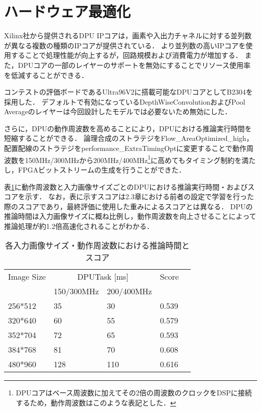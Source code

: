 \section{ハードウェア最適化}
Xilinx社から提供されるDPU IPコアは，画素や入出力チャネルに対する並列数が異なる複数の種類のIPコアが提供されている．
より並列数の高いIPコアを使用することで処理性能が向上するが，回路規模および消費電力が増加する．
また，DPUコアの一部のレイヤーのサポートを無効にすることでリソース使用率を低減することができる．

コンテストの評価ボードであるUltra96V2に搭載可能なDPUコアとしてB2304を採用した．
デフォルトで有効になっているDepthWiseConvolutionおよびPool Averageのレイヤーは今回設計したモデルでは必要ないため無効にした．

さらに，DPUの動作周波数を高めることにより，DPUにおける推論実行時間を短縮することができる．
論理合成のストラテジをFlow\_AreaOptimized\_high，配置配線のストラテジをperformance\_ExtraTimingOptに変更することで動作周波数を150MHz/300MHzから200MHz/400MHz\footnote{DPUコアはベース周波数に加えてその2倍の周波数のクロックをDSPに接続するため，動作周波数はこのような表記とした．}に高めてもタイミング制約を満たし，FPGAビットストリームの生成を行うことができた．

表\ref{runtimetable}に動作周波数と入力画像サイズごとのDPUにおける推論実行時間・およびスコアを示す．
なお，表に示すスコアは2.3章における前者の設定で学習を行った際のスコアであり，最終評価に使用した重みによるスコアとは異なる．
DPUの推論時間は入力画像サイズに概ね比例し，動作周波数を向上させることによって推論処理が約1.2倍高速化されることがわかる．
\begin{table}[h]
    \label{runtimetable}
    \caption{各入力画像サイズ・動作周波数における推論時間とスコア}
    \begin{center}
        \begin{tabular}{lllll}
            Image Size & \multicolumn{2}{c}{DPUTask {[}ms{]}}                            & \multicolumn{1}{c}{Score} &  \\
                & \multicolumn{1}{r}{150/300MHz} & \multicolumn{1}{r}{200/400MHz} &                           &  \\ \hline
        256*512 & 35                             & 30                             & 0.539                     &  \\ \hline
        320*640 & 60                             & 55                             & 0.579                     &  \\ \hline
        352*704 & 72                             & 65                             & 0.593                     &  \\ \hline
        384*768 & 81                             & 70                             & 0.608                     &  \\ \hline
        480*960 & 128                            & 110                            & 0.616                     & 
        \end{tabular}
    \end{center}
\end{table}
